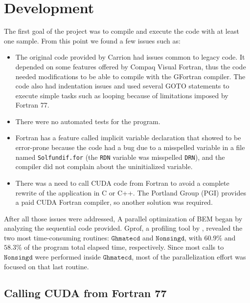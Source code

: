 \chapter{Development}

The first goal of the project was to compile and execute the code with at least one sample. 
From this point we found a few issues such as:

\begin{itemize}
\item The original code provided by Carrion had issues common to legacy code. 
It depended on some features offered by Compaq Visual Fortran, thus the code needed 
modifications to be able to compile with the GFortran compiler. The code also had 
indentation issues and used several GOTO statements to execute simple tasks such 
as looping because of limitations imposed by Fortran 77.

\item There were no automated tests for the program.

\item Fortran has a feature called implicit variable declaration that showed to be 
error-prone because the code had a bug due to a misspelled variable in a file 
named \texttt{Solfundif.for} (the \texttt{RDN} variable was misspelled \texttt{DRN}),
and the compiler did not complain about the uninitialized variable.

\item There was a need to call CUDA code from Fortran to avoid a complete rewrite of the 
application in C or C++. The Portland Group (PGI) provides a paid CUDA Fortran compiler,
so another solution was required.

\end{itemize}


After all those issues were addressed, A parallel optimization of BEM began by analyzing the sequential code provided. 
Gprof, a profiling tool by \cite{binutils}, revealed the two most time-consuming routines: 
$\texttt{Ghmatecd}$ and $\texttt{Nonsingd}$, with $60.9\%$ and $58.3\%$ of the program total 
elapsed time, respectively.
Since most calls to $\texttt{Nonsingd}$ were performed inside $\texttt{Ghmatecd}$, most
of the parallelization effort was focused 
on that last routine.


\section{Calling CUDA from Fortran 77}

